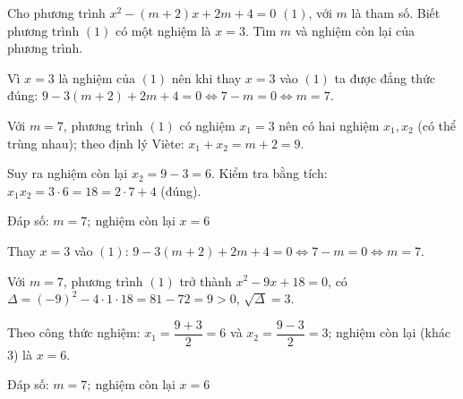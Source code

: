 \begin{problem}[9DS-PT2-013]
Cho phương trình $x^2 - (m + 2)x + 2m + 4 = 0$ $(1)$, với $m$ là tham số. Biết phương trình $(1)$ có một nghiệm là $x = 3$. Tìm $m$ và nghiệm còn lại của phương trình.

\begin{solution}
Vì $x = 3$ là nghiệm của $(1)$ nên khi thay $x = 3$ vào $(1)$ ta được đẳng thức đúng: $9 - 3(m + 2) + 2m + 4 = 0 \Leftrightarrow 7 - m = 0 \Leftrightarrow m = 7$.

Với $m = 7$, phương trình $(1)$ có nghiệm $x_1 = 3$ nên có hai nghiệm $x_1, x_2$ (có thể trùng nhau); theo định lý Viète: $x_1 + x_2 = m + 2 = 9$.

Suy ra nghiệm còn lại $x_2 = 9 - 3 = 6$. Kiểm tra bằng tích: $x_1 x_2 = 3 \cdot 6 = 18 = 2 \cdot 7 + 4$ (đúng).

Đáp số: $\boxed{m = 7;\ \text{nghiệm còn lại } x = 6}$
\end{solution}

\begin{solution}
Thay $x = 3$ vào $(1)$: $9 - 3(m + 2) + 2m + 4 = 0 \Leftrightarrow 7 - m = 0 \Leftrightarrow m = 7$.

Với $m = 7$, phương trình $(1)$ trở thành $x^2 - 9x + 18 = 0$, có $\Delta = (-9)^2 - 4 \cdot 1 \cdot 18 = 81 - 72 = 9 > 0$, $\sqrt{\Delta} = 3$.

Theo công thức nghiệm: $x_1 = \dfrac{9 + 3}{2} = 6$ và $x_2 = \dfrac{9 - 3}{2} = 3$; nghiệm còn lại (khác $3$) là $x = 6$.

Đáp số: $\boxed{m = 7;\ \text{nghiệm còn lại } x = 6}$
\end{solution}
\end{problem}

